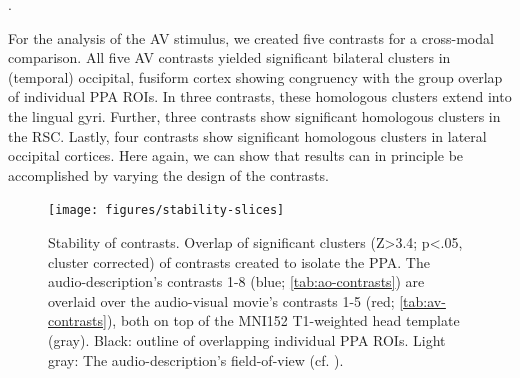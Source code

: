 \documentclass[english]{article}
\begin{document}
.





For the analysis of the AV stimulus, we created five contrasts for a cross-modal
comparison.
All five AV contrasts yielded significant bilateral clusters in (temporal)
occipital, fusiform cortex showing congruency with the group overlap of
individual PPA ROIs.
In three contrasts, these homologous clusters extend into the lingual
gyri.
Further, three contrasts show significant homologous clusters in the RSC.
Lastly, four contrasts show significant homologous clusters in lateral occipital
cortices.
Here again, we can show that results can in principle be accomplished by varying
the design of the contrasts.



\begin{figure} \centering
    \texttt{[image: figures/stability-slices]}
    \caption{Stability of contrasts. Overlap of significant clusters (Z>3.4;
        p<.05, cluster corrected) of contrasts created to isolate the PPA.
        The audio-description's contrasts 1-8 (blue; \ref{tab:ao-contrasts})
        are overlaid over the audio-visual movie's contrasts 1-5 (red;
        \ref{tab:av-contrasts}), both on top of the MNI152 T1-weighted head
        template (gray).
        Black: outline of overlapping individual PPA ROIs.
        Light gray: The audio-description's field-of-view (cf.
        \citep{hanke2014audiomovie}).}
    \label{fig:stability-slices}
    \end{figure}
\end{document}
